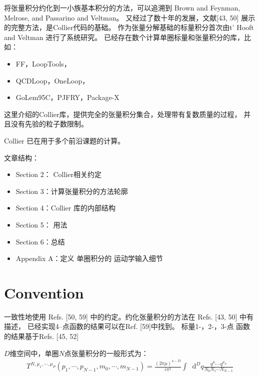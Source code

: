 \documentclass{ctexart}
\newcommand*{\dif}{\mathop{}\!\mathrm{d}}
\begin{document}
将张量积分约化到一小族基本积分的方法，可以追溯到 Brown and Feynman, Melrose, and Passarino and Veltman。
又经过了数十年的发展，文献[43, 50]  展示的完整方法，是Collier代码的基础。
作为张量分解基础的标量积分首次由t' Hooft and Veltman 进行了系统研究。
已经存在数个计算单圈标量和张量积分的库，比如：

\begin{itemize}
    \item FF，LoopTools，
    \item QCDLoop，OneLoop，
    \item GoLem95C，PJFRY，Package-X
\end{itemize}

这里介绍的Collier库，提供完全的张量积分集合，处理带有复数质量的过程，
并且没有先验的粒子数限制。

Collier 已在用于多个前沿课题的计算。

文章结构：

\begin{itemize}
    \item Section 2： Collier相关约定
    \item Section 3：计算张量积分的方法轮廓
    \item Section 4：Collier 库的内部结构
    \item Section 5： 用法
    \item Section 6：总结
    \item Appendix A：定义 单圈积分的 运动学输入细节
\end{itemize}

\section{Convention}

一致性地使用 Refs. [50, 59] 中的约定。约化张量积分的方法在 Refs. [43, 50] 中有描述，
已经实现4--点函数的结果可以在Ref. [59]中找到。
标量1-，2-，3-点 函数的结果基于Refs. [45, 52]

$D$维空间中，单圈$N$点张量积分的一般形式为：
\begin{equation}
    \begin{aligned}      
T^{N,\mu_{1},\cdots, \mu_{P}}(p_{1},\cdots,p_{N-1},m_{0},\cdots,m_{N-1})
=\frac{(2\pi\mu)^{4-D}}{i \pi^2}
\int\dif^D q \frac{q^{\mu_{1}}\cdots q^{\mu_{P}}}{N_0 N_1 \cdots N_{N-1}}
    \end{aligned}
\end{equation}
\end{document}
